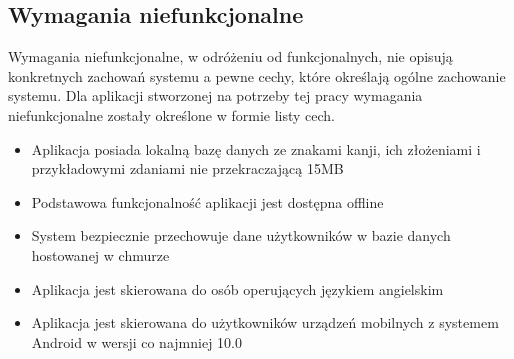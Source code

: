 \documentclass[a4paper,twoside,12pt]{book}
\begin{document}
\subsection{Wymagania niefunkcjonalne}
Wymagania niefunkcjonalne, w odróżeniu od funkcjonalnych, nie opisują konkretnych zachowań systemu a pewne cechy, które określają ogólne zachowanie systemu. Dla aplikacji stworzonej na potrzeby tej pracy wymagania niefunkcjonalne zostały określone w formie listy cech. 
\begin{itemize}
\item Aplikacja posiada lokalną bazę danych ze znakami kanji, ich złożeniami i przykładowymi zdaniami nie przekraczającą 15MB
\item Podstawowa funkcjonalność aplikacji jest dostępna offline
\item System bezpiecznie przechowuje dane użytkowników w bazie danych hostowanej w chmurze
\item Aplikacja jest skierowana do osób operujących językiem angielskim
\item Aplikacja jest skierowana do użytkowników urządzeń mobilnych z systemem Android w wersji co najmniej 10.0
\end{itemize}
\end{document}
